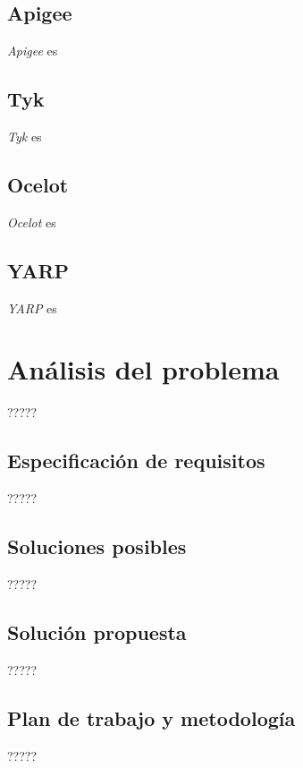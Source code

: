\documentclass[11pt,spanish,listoffigures]{tfgetsinf}
\begin{document}
\section{Apigee}
\emph{Apigee} \cite{Apigee} es
	
\section{Tyk}
\emph{Tyk} \cite{Tyk} es
	
\section{Ocelot}
\emph{Ocelot} \cite{Ocelot} es
	
\section{YARP}
\emph{YARP} \cite{YARP} es




\chapter{Análisis del problema}

?????

\section{Especificación de requisitos}

?????

\section{Soluciones posibles}

?????

\section{Solución propuesta}

?????

\section{Plan de trabajo y metodología}

?????

\end{document}
